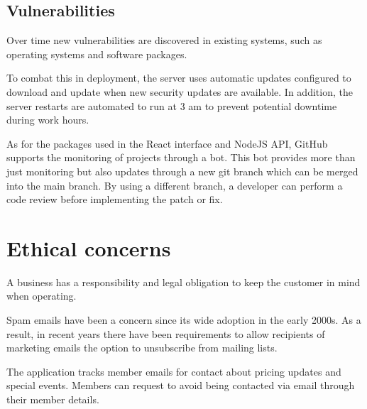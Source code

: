 \subsection{Vulnerabilities}
Over time new vulnerabilities are discovered in existing systems, such as operating systems and software packages.

To combat this in deployment, the server uses automatic updates configured to download and update when new security updates are available. In addition, the server restarts are automated to run at 3 am to prevent potential downtime during work hours.

As for the packages used in the React interface and NodeJS API, GitHub supports the monitoring of projects through a bot. This bot provides more than just monitoring but also updates through a new git branch which can be merged into the main branch. By using a different branch, a developer can perform a code review before implementing the patch or fix. 


\section{Ethical concerns}
A business has a responsibility and legal obligation to keep the customer in mind when operating.

Spam emails have been a concern since its wide adoption in the early 2000s. As a result, in recent years there have been requirements to allow recipients of marketing emails the option to unsubscribe from mailing lists. 

The application tracks member emails for contact about pricing updates and special events. Members can request to avoid being contacted via email through their member details.
